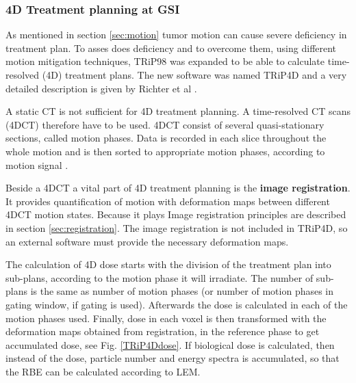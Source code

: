 \documentclass[type=dr, dr=rernat, accentcolor=tud7b,colorbacktitle, bigchapter, openright, twoside, 12pt ]{tudthesis}
\begin{document}
\subsubsection{4D Treatment planning at GSI}

As mentioned in section \ref{sec:motion} tumor motion can cause severe deficiency in treatment plan. To asses does deficiency and to overcome them, using different motion mitigation techniques, 
TRiP98 was expanded to be able to calculate time-resolved (4D) treatment plans. The new software was named TRiP4D and a very detailed description is given by Richter et al \cite{Richter2013}.

A static CT is not sufficient for 4D treatment planning. A time-resolved CT scans (4DCT) therefore have to be used. 4DCT consist of several quasi-stationary sections, called motion phases. Data is
recorded in each slice throughout the whole motion and is then sorted to appropriate motion phases, according to motion signal \cite{Rietzel2005}.

Beside a 4DCT a vital part of 4D treatment planning is the \textbf{image registration}. It provides quantification of motion with deformation maps between different 4DCT motion states. Because it plays
Image registration principles are described in section \ref{sec:registration}. The image registration is not included in TRiP4D, so an external software must provide the necessary
deformation maps.

The calculation of 4D dose starts with the division of the treatment plan into sub-plans, according to the motion phase it will irradiate. The number of sub-plans is the same as number of motion phases (or number of motion phases
in gating window, if gating is used). Afterwards the dose is calculated in each of the motion phases used. Finally, dose in each voxel is then transformed with the deformation maps
obtained from registration, in the reference phase to get accumulated dose, see Fig. \ref{TRiP4Ddose}. If biological dose is calculated, then instead of the dose, particle number and energy spectra is accumulated, 
so that the RBE can be calculated according to LEM.
\end{document}

